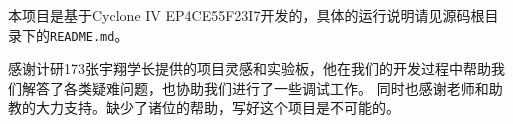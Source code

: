 
 本项目是基于Cyclone IV EP4CE55F23I7开发的，具体的运行说明请见源码根目录下的\texttt{README.md}。

 感谢计研173张宇翔学长提供的项目灵感和实验板，他在我们的开发过程中帮助我们解答了各类疑难问题，也协助我们进行了一些调试工作。
 同时也感谢老师和助教的大力支持。缺少了诸位的帮助，写好这个项目是不可能的。